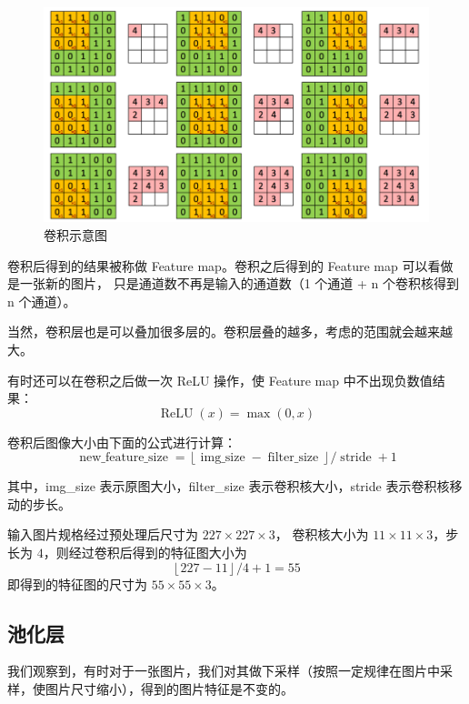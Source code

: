 \begin{figure}[htbp]
    \centering
    \caption{卷积示意图}
    \includegraphics[scale = 0.5]{convolution.png}
\end{figure}

卷积后得到的结果被称做 Feature map。卷积之后得到的 Feature map 可以看做是一张新的图片，
只是通道数不再是输入的通道数（1 个通道 + n 个卷积核得到 n 个通道）。

当然，卷积层也是可以叠加很多层的。卷积层叠的越多，考虑的范围就会越来越大。

有时还可以在卷积之后做一次 ReLU 操作，使 Feature map 中不出现负数值结果：
\begin{equation}
    \operatorname{ReLU}(x) = \max(0, x)
\end{equation}

卷积后图像大小由下面的公式进行计算：
\begin{equation}
    \operatorname{new\_feature\_size} = \left\lfloor\operatorname{img\_size} - 
    \operatorname{filter\_size}\right\rfloor / \operatorname{stride} + 1
\end{equation}

其中，img\_size 表示原图大小，filter\_size 表示卷积核大小，stride 表示卷积核移动的步长。

\begin{example}
    输入图片规格经过预处理后尺寸为 $227 \times 227 \times 3$，
    卷积核大小为 $11 \times 11 \times 3$，步长为 $4$，则经过卷积后得到的特征图大小为
    \begin{equation*}
        \left\lfloor227 - 11\right\rfloor / 4 + 1 = 55
    \end{equation*}
    即得到的特征图的尺寸为 $55 \times 55 \times 3$。
\end{example}

\subsection{池化层}
我们观察到，有时对于一张图片，我们对其做下采样（按照一定规律在图片中采样，使图片尺寸缩小），得到的图片特征是不变的。

